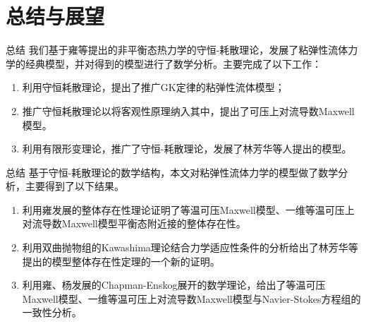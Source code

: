 \documentclass[mathserif]{beamer}
\begin{document}
\section{总结与展望}
\begin{frame}{总结}
我们基于雍等提出的非平衡态热力学的守恒-耗散理论，发展了粘弹性流体力学的经典模型，并对得到的模型进行了数学分析。主要完成了以下工作：
\begin{enumerate}
	\item<2-> 利用守恒耗散理论，提出了推广GK定律的粘弹性流体模型；%
	\item<3-> 推广守恒耗散理论以将客观性原理纳入其中，提出了可压上对流导数Maxwell模型。
	\item<4-> 利用有限形变理论，推广了守恒-耗散理论，发展了林芳华等人提出的模型。
\end{enumerate}
\end{frame}
\begin{frame}{总结}
基于守恒-耗散理论的数学结构，本文对粘弹性流体力学的模型做了数学分析，主要得到了以下结果。
\begin{enumerate}
	\item<2-> 利用雍发展的整体存在性理论证明了等温可压Maxwell模型、一维等温可压上对流导数Maxwell模型平衡态附近接的整体存在性。
	\item<3-> 利用双曲抛物组的Kawashima理论结合力学适应性条件的分析给出了林芳华等提出的模型整体存在性定理的一个新的证明。
	\item<4-> 利用雍、杨发展的Chapman-Enskog展开的数学理论，给出了等温可压Maxwell模型、一维等温可压上对流导数Maxwell模型与Navier-Stokes方程组的一致性分析。
\end{enumerate}
\end{frame}

\end{document}
